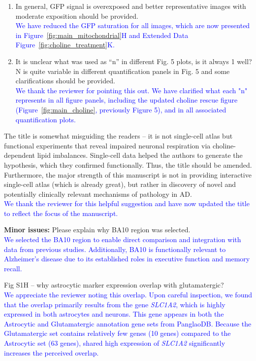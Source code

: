 \begin{enumerate}
	\item In general, GFP signal is overexposed and better representative images with moderate exposition should be provided.\\
	\textcolor{blue}{We have reduced the GFP saturation for all images, which are now presented in Figure~\ref{fig:main_mitochondrial}H and Extended Data Figure~\ref{fig:choline_treatment}K.} 

	\item It is unclear what was used as “n” in different Fig. 5 plots, is it always 1 well? N is quite variable in different quantification panels in Fig. 5 and some clarifications should be provided.\\
	\textcolor{blue}{We thank the reviewer for pointing this out. We have clarified what each "n" represents in all figure panels, including the updated choline rescue figure (Figure~\ref{fig:main_choline}, previously Figure 5), and in all associated quantification plots.}

\end{enumerate}

The title is somewhat misguiding the readers – it is not single-cell atlas but functional experiments that reveal impaired neuronal respiration via choline-dependent lipid imbalances. Single-cell data helped the authors to generate the hypothesis, which they confirmed functionally. Thus, the title should be amended. Furthermore, the major strength of this manuscript is not in providing interactive single-cell atlas (which is already great), but rather in discovery of novel and potentially clinically relevant mechanisms of pathology in AD.\\
\textcolor{blue}{We thank the reviewer for this helpful suggestion and have now updated the title to reflect the focus of the manuscript.}

\textbf{Minor issues:}
Please explain why BA10 region was selected.\\
\textcolor{blue}{We selected the BA10 region to enable direct comparison and integration with data from previous studies. Additionally, BA10 is functionally relevant to Alzheimer's disease due to its established roles in executive function and memory recall.}

Fig S1H – why astrocytic marker expression overlap with glutamatergic?\\	
\textcolor{blue}{We appreciate the reviewer noting this overlap. Upon careful inspection, we found that the overlap primarily results from the gene \textit{SLC1A2}, which is highly expressed in both astrocytes and neurons. This gene appears in both the Astrocytic and Glutamatergic annotation gene sets from PanglaoDB. Because the Glutamatergic set contains relatively few genes (10 genes) compared to the Astrocytic set (63 genes), shared high expression of \textit{SLC1A2} significantly increases the perceived overlap.}

